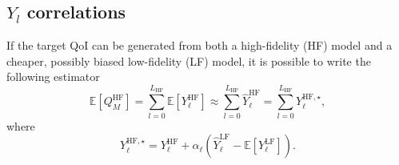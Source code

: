 \subsection{$Y_l$ correlations} \label{uq:sampling:mlmf:Ycorr}

If the target QoI can be generated from both a high-fidelity (HF) model 
and a cheaper, possibly biased low-fidelity (LF) model, it is possible 
to write the following estimator
\begin{equation}\label{EQ: MLMF estimator}
 \mathbb{E}\left[Q_M^{\mathrm{HF}}\right] = \sum_{l=0}^{L_{\mathrm{HF}}} \mathbb{E}\left[Y^{\mathrm{HF}}_{\ell}\right] 
                                          \approx \sum_{l=0}^{L_{\mathrm{HF}}} \hat{Y}^{\mathrm{HF}}_{\ell} = \sum_{l=0}^{L_{\mathrm{HF}}} Y^{{\mathrm{HF}},\star}_{\ell},
\end{equation}
where
\begin{equation}
 Y^{{\mathrm{HF}},\star}_{\ell} = Y^{\mathrm{HF}}_{\ell} + \alpha_\ell \left( \hat{Y}^{\mathrm{LF}}_{\ell} - \mathbb{E}\left[{Y^{\mathrm{LF}}_{\ell}}\right] \right).
\end{equation}

